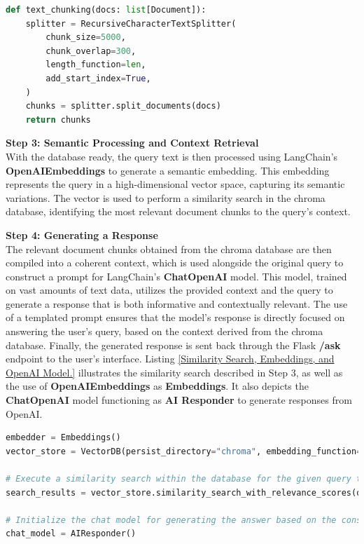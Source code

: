 \documentclass{l4proj}
\begin{document}
\begin{lstlisting}[language=Python, caption={Text Chunking.}, label={Text Chunking.}]
def text_chunking(docs: list[Document]):
    splitter = RecursiveCharacterTextSplitter(
        chunk_size=5000,
        chunk_overlap=300,
        length_function=len,
        add_start_index=True,
    )
    chunks = splitter.split_documents(docs)
    return chunks
\end{lstlisting}




\textbf{Step 3: Semantic Processing and Context Retrieval}
\\
With the database ready, the query text is then processed using LangChain's \textbf{OpenAIEmbeddings} to generate a semantic embedding. This embedding represents the query in a high-dimensional vector space, capturing its semantic variations. The vector is used to perform a similarity search in the chroma database, identifying the most relevant document chunks to the query's context. 


\textbf{Step 4: Generating a Response}
\\
The relevant document chunks obtained from the chroma database are then compiled into a coherent context, which is used alongside the original query to construct a prompt for LangChain's \textbf{ChatOpenAI} model. This model, trained on vast amounts of text data, utilizes the provided context and the query to generate a response that is both informative and contextually relevant. The use of a templated prompt ensures that the model's response is directly focused on answering the user's query, based on the context derived from the chroma database. Finally, the generated response is sent back through the Flask \textbf{/ask} endpoint to the user's interface. Listing \ref{Similarity Search, Embeddings, and OpenAI Model.} illustrates the similarity search described in Step 3, as well as the use of \textbf{OpenAIEmbeddings} as \textbf{Embeddings}. It also depicts the \textbf{ChatOpenAI} model functioning as \textbf{AI Responder} to generate responses from OpenAI.


\begin{lstlisting}[language=Python, caption={Similarity Search, Embeddings, and OpenAI Model.}, label={Similarity Search, Embeddings, and OpenAI Model.}]
embedder = Embeddings()
vector_store = VectorDB(persist_directory="chroma", embedding_function=embedder)

# Execute a similarity search within the database for the given query text, limiting results to top 2 matches.
search_results = vector_store.similarity_search_with_relevance_scores(query_text, k=2)

# Initialize the chat model for generating the answer based on the constructed prompt.
chat_model = AIResponder()
\end{lstlisting}
\end{document}
